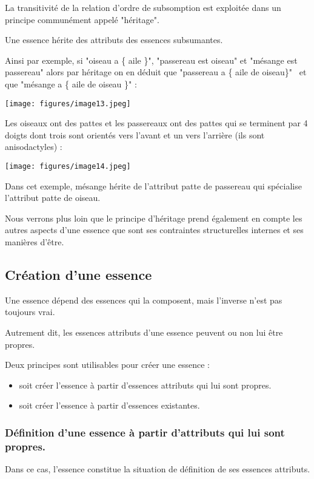 \documentclass[a4paper, 12pt, openright, french]{book}
\begin{document}
La transitivité de la relation d'ordre de subsomption
est exploitée dans un principe communément appelé "héritage".

Une essence hérite des attributs des essences subsumantes.

Ainsi par exemple, si "oiseau a \{ aile \}", "passereau est oiseau" et
"mésange est passereau" alors par héritage on en déduit que "passereau a
\{ aile de oiseau\}"~ et que "mésange a \{ aile de oiseau \}" :

\texttt{[image: figures/image13.jpeg]}

Les oiseaux ont des pattes et les passereaux ont des pattes qui se
terminent par 4 doigts dont trois sont orientés vers l'avant et un vers
l'arrière (ils sont anisodactyles) :

\texttt{[image: figures/image14.jpeg]}

Dans cet exemple, mésange hérite de l'attribut patte de
passereau qui spécialise l'attribut patte de oiseau.

Nous verrons plus loin que le principe d'héritage prend
également en compte les autres aspects d'une essence que
sont ses contraintes structurelles internes et ses manières
d'être.

\newpage
\raggedbottom
\subsection{Création d'une essence}

Une essence dépend des essences qui la composent, mais
l'inverse n'est pas toujours vrai.

Autrement dit, les essences attributs d'une essence
peuvent ou non lui être propres.

Deux principes sont utilisables pour créer une essence :

\begin{itemize}
\item
  soit créer l'essence à partir
  d'essences attributs qui lui sont propres.
\item
  soit créer l'essence à partir
  d'essences existantes.
\end{itemize}

\subsubsection{Définition d'une essence à partir
d'attributs qui lui sont propres.}

Dans ce cas, l'essence constitue la situation de
définition de ses essences attributs.
\end{document}
